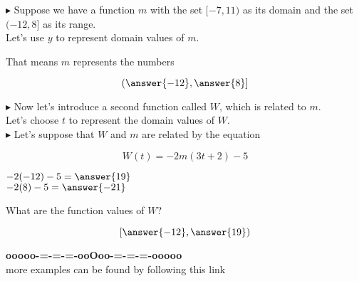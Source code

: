 \documentclass{ximera}
\begin{document}
\begin{example}




\textbf{\textcolor{blue!55!black}{$\blacktriangleright$}}  Suppose we have a function $m$ with the set $[-7, 11)$ as its domain and the set $(-12, 8]$ as its range. \\

Let's use $y$ to represent domain values of $m$.  



\begin{question}

That means $m$ represents the numbers 

\[
\left( \answer{-12}, \answer{8} \right]
\]

\end{question}






\textbf{\textcolor{blue!55!black}{$\blacktriangleright$}} Now let's introduce a second function called $W$, which is related to $m$. \\

Let's choose $t$ to represent the domain values of $W$. \\


\textbf{\textcolor{blue!55!black}{$\blacktriangleright$}} Let's suppose that $W$ and $m$ are related by the equation 

\[ 
W(t) = -2 m(3t + 2) - 5
\]





\begin{question}

$-2 (-12) - 5 = \answer{19}$ \\

$-2 (8) - 5 = \answer{-21}$ \\

\end{question}






\begin{question}

What are the function values of $W$?


\[
\left[ \answer{-12}, \answer{19} \right)
\]


\end{question}


\end{example}


















\begin{center}
\textbf{\textcolor{green!50!black}{ooooo-=-=-=-ooOoo-=-=-=-ooooo}} \\

more examples can be found by following this link\\ 

\end{center}
\end{document}
